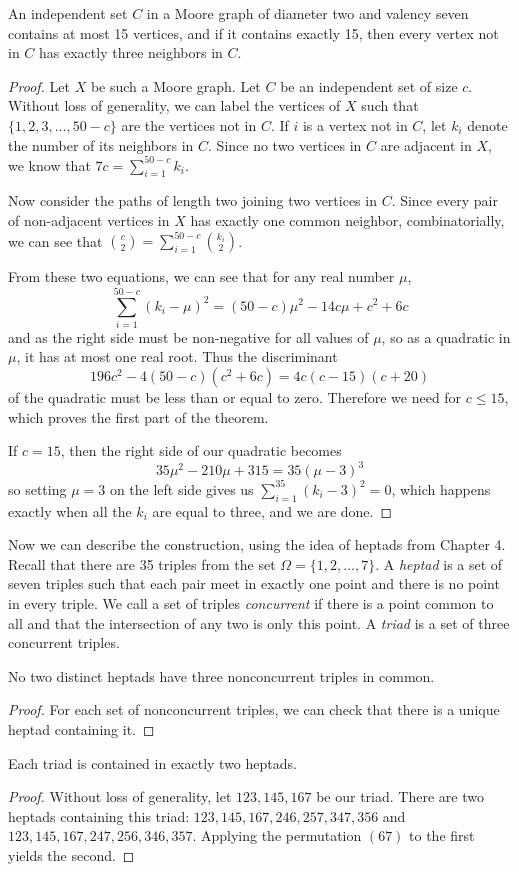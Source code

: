 \begin{lemma}
	An independent set $C$ in a Moore graph of diameter two and valency seven contains at most 15 vertices, and if it contains exactly 15, then every vertex not in $C$ has exactly three neighbors in $C$.
\end{lemma}
\begin{proof}
	Let $X$ be such a Moore graph. Let $C$ be an independent set of size $c$.  Without loss of generality, we can label the vertices of $X$ such that $\{1,2,3,\dots,50-c\}$ are the vertices not in $C$.  If $i$ is a vertex not in $C$, let $k_i$ denote the number of its neighbors in $C$.  Since no two vertices in $C$ are adjacent in $X$, we know that $7c=\sum\limits_{i=1}^{50-c}k_i$.
	
	Now consider the paths of length two joining two vertices in $C$.  Since every pair of non-adjacent vertices in $X$ has exactly one common neighbor, combinatorially, we can see that $\binom{c}{2}=\sum\limits_{i=1}^{50-c}\binom{k_i}{2}$.
	
	From these two equations, we can see that for any real number $\mu$,
	$$\sum\limits_{i=1}^{50-c}(k_i-\mu)^2 = (50-c)\mu^2-14c\mu+c^2+6c$$
	and as the right side must be non-negative for all values of $\mu$, so as a quadratic in $\mu$, it has at most one real root.  Thus the discriminant 
	$$196c^2-4(50-c)(c^2+6c)=4c(c-15)(c+20)$$
	of the quadratic must be less than or equal to zero.  Therefore we need for $c\leq 15$, which proves the first part of the theorem.
	
	If $c=15$, then the right side of our quadratic becomes
	$$35\mu^2-210\mu+315=35(\mu-3)^3$$
	so setting $\mu=3$ on the left side gives us $\sum\limits_{i=1}^35 (k_i-3)^2=0$, which happens exactly when all the $k_i$ are equal to three, and we are done.
\end{proof}



Now we can describe the construction, using the idea of heptads from Chapter 4.  Recall that there are 35 triples from the set $\Omega=\{1,2,\dots, 7\}$. A \textit{heptad} is a set of seven triples such that each pair meet in exactly one point and there is no point in every triple. We call a set of triples \textit{concurrent} if there is a point common to all and that the intersection of any two is only this point.  A \textit{triad} is a set of three concurrent triples.

\begin{claim}
	No two distinct heptads have three nonconcurrent triples in common.
\end{claim}
\begin{proof}
	For each set of nonconcurrent triples, we can check that there is a unique heptad containing it.
\end{proof}
\begin{claim}
	Each triad is contained in exactly two heptads.
\end{claim}
\begin{proof}
	Without loss of generality, let $123,145,167$ be our triad.  There are two heptads containing this triad: $123,145,167,246,257,347,356$ and $123,145,167,247,256,346,357$.  Applying the permutation $(67)$ to the first yields the second.
\end{proof}

